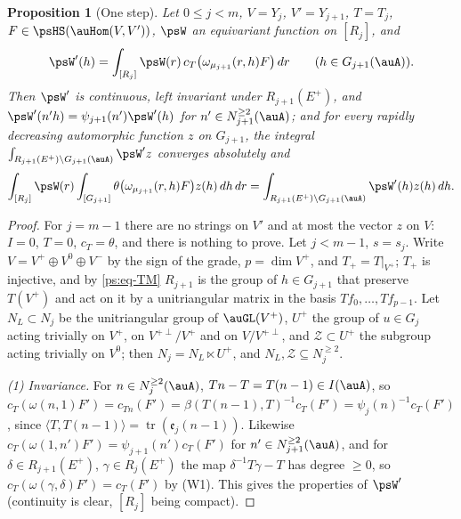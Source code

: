 \documentclass[10pt]{amsart}
\newtheorem{proposition}[theorem]{Proposition}
\theoremstyle{definition}
\theoremstyle{remark}
\begin{document}
\begin{proposition}[One step]\label{ps:onestep}
Let $0\le j<m$, $V=Y_j$, $V'=Y_{j+1}$, $T=T_j$, $F\in\psHS(\auHom(V,V'))$, $\psW$ an equivariant
function on $[R_j]$, and
\[
\psW'(h)=\int_{[R_j]}\psW(r)\,c_T\bigl(\omega_{\mu_{j+1}}(r,h)F\bigr)\,dr\qquad(h\in G_{j+1}(\auA)).
\]
Then $\psW'$ is continuous, left invariant under $R_{j+1}(E^+)$, and $\psW'(n'h)=\psi_{j+1}(n')
\psW'(h)$ for $n'\in N_{j+1}^{\ge2}(\auA)$; and for every rapidly decreasing automorphic function
$z$ on $G_{j+1}$, the integral $\int_{R_{j+1}(E^+)\backslash G_{j+1}(\auA)}\psW'z$ converges
absolutely and
\[
\int_{[R_j]}\psW(r)\int_{[G_{j+1}]}\theta\bigl(\omega_{\mu_{j+1}}(r,h)F\bigr)z(h)\,dh\,dr=
\int_{R_{j+1}(E^+)\backslash G_{j+1}(\auA)}\psW'(h)z(h)\,dh .
\]
\end{proposition}
\begin{proof}
For $j=m-1$ there are no strings on $V'$ and at most the vector $z$ on $V$: $I=0$, $T=0$, $c_T=
\theta$, and there is nothing to prove. Let $j<m-1$, $s=s_j$. Write $V=V^+\oplus V^0\oplus V^-$
by the sign of the grade, $p=\dim V^+$, and $T_+=T|_{V^+}$; $T_+$ is injective, and by
\eqref{ps:eq-TM} $R_{j+1}$ is the group of $h\in G_{j+1}$ that preserve $T(V^+)$ and act on it by a
unitriangular matrix in the basis $Tf_0,\dots,Tf_{p-1}$. Let $N_L\subset N_j$ be the unitriangular
group of $\auGL(V^+)$, $U^+$ the group of $u\in G_j$ acting trivially on $V^+$, on
$V^{+\perp}/V^+$ and on $V/V^{+\perp}$, and $\mathcal Z\subset U^+$ the subgroup acting trivially on
$V^0$; then $N_j=N_L\ltimes U^+$, and $N_L,\mathcal Z\subseteq N_j^{\ge2}$.

\emph{(1) Invariance.} For $n\in N_j^{\ge2}(\auA)$, $Tn-T=T(n-1)\in I(\auA)$, so
$c_T(\omega(n,1)F')=c_{Tn}(F')=\beta(T(n-1),T)^{-1}c_T(F')=\psi_j(n)^{-1}c_T(F')$, since
$\langle T,T(n-1)\rangle=\operatorname{tr}(\mathfrak e_j(n-1))$. Likewise $c_T(\omega(1,n')F')=
\psi_{j+1}(n')c_T(F')$ for $n'\in N^{\ge2}_{j+1}(\auA)$, and for $\delta\in R_{j+1}(E^+)$,
$\gamma\in R_j(E^+)$ the map $\delta^{-1}T\gamma-T$ has degree $\ge0$, so
$c_T(\omega(\gamma,\delta)F')=c_T(F')$ by (W1). This gives the properties of $\psW'$ (continuity
is clear, $[R_j]$ being compact).


\end{proof}
\end{document}
